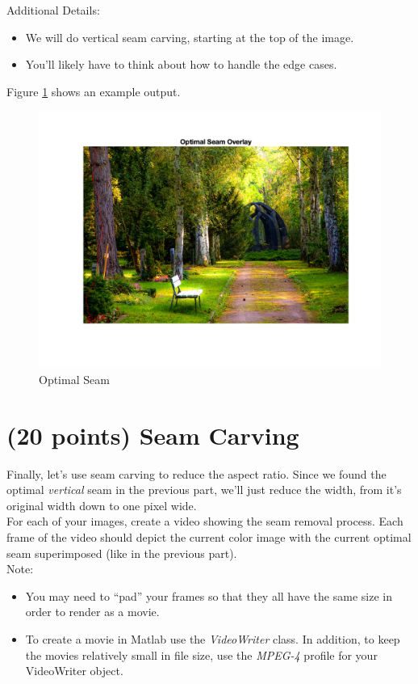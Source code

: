 \documentclass[12pt]{article}
\begin{document}
\noindent
Additional Details:
\begin{itemize}
\item We will do vertical seam carving, starting at the top of the image.
\item You’ll likely have to think about how to handle the edge cases.
\end{itemize}

\noindent
Figure \ref{fig2} shows an example output.

\begin{figure}[H]
\begin{center}
\includegraphics{seam.png}
\caption{Optimal Seam}
\label{fig2}
\end{center}
\end{figure}

\newpage

\section{(20 points) Seam Carving}
Finally, let's use seam carving to reduce the aspect ratio. Since we found the optimal \emph{vertical} seam in the previous part, we'll just reduce the width, from it's original width down to one pixel wide. \\

\noindent
For each of your images, create a video showing the seam removal process.  Each frame of the video should depict the current color image with the current optimal seam superimposed (like in the previous part). \\

\noindent
Note:
\begin{itemize}
\item You may need to “pad” your frames so that they all have the same size in order to render as a movie.
\item To create a movie in Matlab use the \emph{VideoWriter} class.  In addition, to keep the movies relatively small in file size, use the \emph{MPEG-4} profile for your VideoWriter object.
\end{itemize}
\end{document}
